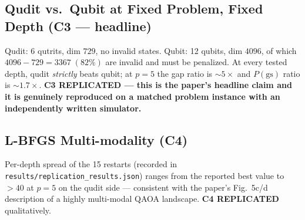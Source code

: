 \documentclass[11pt]{article}
\begin{document}
\subsection{Qudit vs.\ Qubit at Fixed Problem, Fixed Depth (C3 --- headline)}
Qudit: 6 qutrits, dim $729$, no invalid states.
Qubit: 12 qubits, dim $4096$, of which $4096-729=3367\;(82\%)$ are invalid
and must be penalized. At every tested depth, qudit \emph{strictly} beats
qubit; at $p=5$ the gap ratio is $\sim5\times$ and $P(\mathrm{gs})$ ratio
is $\sim1.7\times$. \textbf{C3 REPLICATED --- this is the paper's headline
claim and it is genuinely reproduced on a matched problem instance with an
independently written simulator.}

\subsection{L-BFGS Multi-modality (C4)}
Per-depth spread of the 15 restarts (recorded in
\texttt{results/replication\_results.json}) ranges from the reported best
value to $>40$ at $p=5$ on the qudit side --- consistent with the paper's
Fig.~5c/d description of a highly multi-modal QAOA landscape.
\textbf{C4 REPLICATED} qualitatively.
\end{document}
